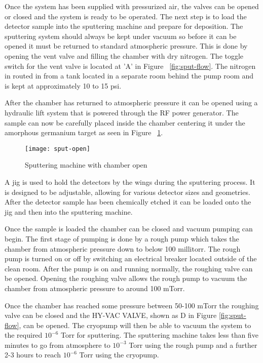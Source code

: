 Once the system has been supplied with pressurized air, the valves can be opened or closed and the system is ready to be operated.
The next step is to load the detector sample into the sputtering machine and prepare for deposition.
The sputtering system should always be kept under vacuum so before it can be opened it must be returned to standard atmospheric pressure.
This is done by opening the vent valve and filling the chamber with dry nitrogen.
The toggle switch for the vent valve is located at 'A' in Figure ~\ref{fig:sput-flow}.
The nitrogen in routed in from a tank located in a separate room behind the pump room and is kept at approximately 10 to 15 psi.

After the chamber has returned to atmospheric pressure it can be opened using a hydraulic lift system that is powered through the RF power generator.
The sample can now be carefully placed inside the chamber centering it under the amorphous germanium target as seen in Figure ~\ref{fig:sput-open}.
\begin{figure}[htpb]
\centering
\texttt{[image: sput-open]}
\caption{Sputtering machine with chamber open}
\label{fig:sput-open}
\end{figure}
A jig is used to hold the detectors by the wings during the sputtering process.
It is designed to be adjustable, allowing for various detector sizes and geometries.
After the detector sample has been chemically etched it can be loaded onto the jig and then into the sputtering machine.

Once the sample is loaded the chamber can be closed and vacuum pumping can begin.
The first stage of pumping is done by a rough pump which takes the chamber from atmospheric pressure down to below 100 millitorr.
The rough pump is turned on or off by switching an electrical breaker located outside of the clean room.
After the pump is on and running normally, the roughing valve can be opened.
Opening the roughing valve allows the rough pump to vacuum the chamber from atmospheric pressure to around 100 mTorr.

Once the chamber has reached some pressure between 50-100 mTorr the roughing valve can be closed and the HY-VAC VALVE, shown as D in Figure \ref{fig:sput-flow}, can be opened.
The cryopump will then be able to vacuum the system to the required $10^{-6}$ Torr for sputtering.
The sputtering machine takes less than five minutes to go from atmosphere to $10^{-3}$ Torr using the rough pump and a further 2-3 hours to reach $10^{-6}$ Torr using the cryopump.


